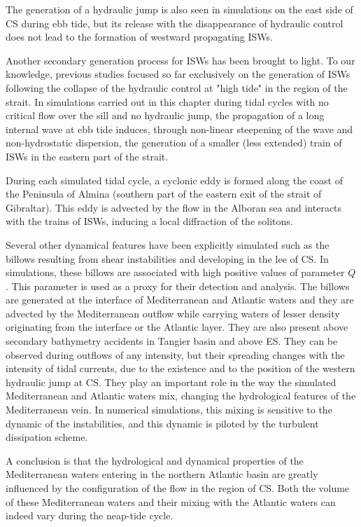 \color{red}The generation of a hydraulic jump is also seen in simulations on the east side of CS  during ebb tide, but its release with the disappearance of hydraulic control does not lead to the formation of westward propagating ISWs.\color{black}

Another secondary generation process for ISWs has been brought to light. To our knowledge, previous studies focused so far exclusively on the generation of ISWs following the collapse of the hydraulic control at "high tide" in the region of the strait. In simulations carried out in this chapter during tidal cycles with no critical flow over the sill and no hydraulic jump, the propagation of a long internal wave at ebb tide induces, through non-linear steepening of the wave and non-hydrostatic dispersion, the generation of a smaller (less extended) train of ISWs in the eastern part of the strait.

During each simulated tidal cycle, a cyclonic eddy is formed along the coast of the Peninsula of Almina (southern part of the eastern exit of the strait of Gibraltar). This eddy is advected by the flow in the Alboran sea and interacts with the trains of ISWs, inducing a local diffraction of the solitons. 

Several other dynamical features have been explicitly simulated such as the billows resulting from shear instabilities and developing in the lee of CS. In simulations, these billows are associated with high positive values of parameter $Q$. This parameter is used as a proxy for their detection and analysis. The billows are generated at the interface of Mediterranean and Atlantic waters and they are advected by the Mediterranean outflow while carrying waters of lesser density originating from the interface or the Atlantic layer. They are also present above secondary bathymetry accidents in Tangier basin and above ES. They can be observed during outflows of any intensity, but their spreading changes with the intensity of tidal currents, due to the existence and to the position of the western hydraulic jump at CS. They play an important role in the way the simulated Mediterranean and Atlantic waters mix, changing the hydrological features of the Mediterranean vein. In numerical simulations, this mixing is sensitive to the dynamic of the instabilities, and this dynamic is piloted by the turbulent dissipation scheme.

A conclusion is that the hydrological and dynamical properties of the Mediterranean waters entering in the northern Atlantic basin are greatly influenced by the configuration of the flow in the region of CS. Both the volume of these Mediterranean waters and their mixing with the Atlantic waters can indeed vary during the neap-tide cycle. 

